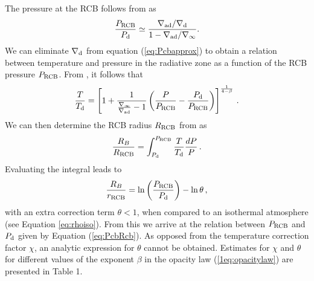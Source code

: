 The pressure at the RCB follows from  as
\begin{equation}
\label{eq:Pcbapprox}
{P_{\rm RCB}\over P_{\rm d}} \simeq {\nabla_{\rm ad}/\nabla_{\rm d}\over 1 - \nabla_{\rm ad}/\nabla_\infty}.
\end{equation} 
 We can eliminate $\nabla_{\rm d}$ from equation (\ref{eq:Pcbapprox}) to obtain a relation between temperature and pressure in the radiative zone as a function of the RCB pressure $P_{\rm RCB}$. From , it follows that
 \begin{equation}\label{eq:TP}
{T \over T_{\rm d}} = \left[1 + {1 \over {\nabla_\infty \over \nabla_{\rm ad}} - 1} \left({P \over P_{\rm RCB}} -  {P_{\rm d} \over P_{\rm RCB}}\right) \right]^{1 \over 4-\beta}\, .
\end{equation} 
 We can then determine the RCB radius $R_{\rm RCB}$ from  as 
\begin{equation}\label{eq:RCBint}
{R_B \over R_{\rm RCB}} = \int_{P_{\rm d}}^{P_{\rm RCB}} {T \over T_{\rm d}} {dP \over P}\, .
\end{equation}
Evaluating the integral leads to 
\begin{equation}\label{eq:Rcb}
{R_B \over r_{\rm RCB}} = \ln \left(P_{\rm RCB} \over P_{\rm d} \right) - \ln \theta \, ,
\end{equation} 
with an extra correction term $\theta < 1$, when compared to an isothermal atmosphere (see Equation \ref{eq:rhoiso}). From this we arrive at the relation between $P_{\rm RCB}$ and $P_{\rm d}$ given by Equation (\ref{eq:PcbRcb}). As opposed from the temperature correction factor $\chi$, an analytic expression for  $\theta$ cannot be obtained. Estimates for $\chi$ and $\theta$ for different values of the exponent $\beta$ in the opacity law (\ref{1eq:opacitylaw}) are presented in Table 1.







